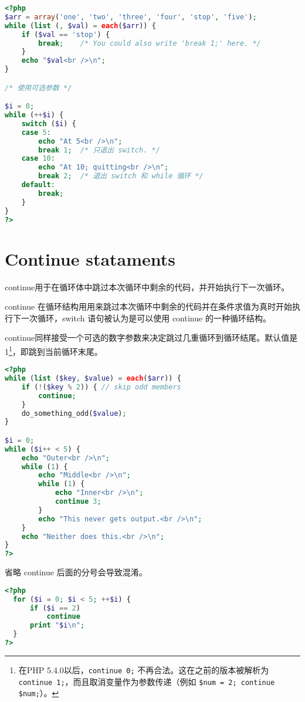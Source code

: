 \begin{lstlisting}[language=PHP]
<?php
$arr = array('one', 'two', 'three', 'four', 'stop', 'five');
while (list (, $val) = each($arr)) {
    if ($val == 'stop') {
        break;    /* You could also write 'break 1;' here. */
    }
    echo "$val<br />\n";
}

/* 使用可选参数 */

$i = 0;
while (++$i) {
    switch ($i) {
    case 5:
        echo "At 5<br />\n";
        break 1;  /* 只退出 switch. */
    case 10:
        echo "At 10; quitting<br />\n";
        break 2;  /* 退出 switch 和 while 循环 */
    default:
        break;
    }
}
?>
\end{lstlisting}






\section{Continue stataments}


continue用于在循环体中跳过本次循环中剩余的代码，并开始执行下一次循环。



continue 在循环结构用用来跳过本次循环中剩余的代码并在条件求值为真时开始执行下一次循环，switch 语句被认为是可以使用 continue 的一种循环结构。

continue同样接受一个可选的数字参数来决定跳过几重循环到循环结尾。默认值是 1\footnote{在PHP 5.4.0以后，\texttt{continue 0;} 不再合法。这在之前的版本被解析为 \texttt{continue 1;}，而且取消变量作为参数传递（例如 \texttt{\$num = 2; continue \$num;}）。}，即跳到当前循环末尾。

\begin{lstlisting}[language=PHP]
<?php
while (list ($key, $value) = each($arr)) {
    if (!($key % 2)) { // skip odd members
        continue;
    }
    do_something_odd($value);
}

$i = 0;
while ($i++ < 5) {
    echo "Outer<br />\n";
    while (1) {
        echo "Middle<br />\n";
        while (1) {
            echo "Inner<br />\n";
            continue 3;
        }
        echo "This never gets output.<br />\n";
    }
    echo "Neither does this.<br />\n";
}
?>
\end{lstlisting}

省略 continue 后面的分号会导致混淆。

\begin{lstlisting}[language=PHP]
<?php
  for ($i = 0; $i < 5; ++$i) {
      if ($i == 2)
          continue
      print "$i\n";
  }
?>
\end{lstlisting}

